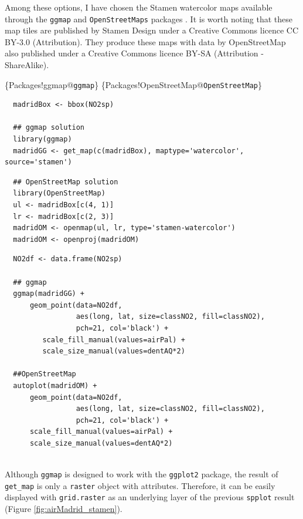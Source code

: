 Among these options, I have chosen the Stamen watercolor maps
available through the \texttt{ggmap} \cite{Kahle.Wickham2013} and
\texttt{OpenStreetMaps} packages \cite{Fellows.Stotz2013}. It is worth noting
that these map tiles are published by Stamen Design under a Creative
Commons licence CC BY-3.0 (Attribution). They produce these maps with
data by OpenStreetMap also published under a Creative Commons licence
BY-SA (Attribution - ShareAlike).

\begin{LaTeX}
\index\{Packages!ggmap@\texttt{ggmap}\}
\index\{Packages!OpenStreetMap@\texttt{OpenStreetMap}\}
\end{LaTeX}

\lstset{language=r,label= ,caption= ,captionpos=b,numbers=none}
\begin{lstlisting}
  madridBox <- bbox(NO2sp)

  ## ggmap solution
  library(ggmap)
  madridGG <- get_map(c(madridBox), maptype='watercolor', source='stamen')
\end{lstlisting}

\lstset{language=r,label= ,caption= ,captionpos=b,numbers=none}
\begin{lstlisting}
  ## OpenStreetMap solution
  library(OpenStreetMap)
  ul <- madridBox[c(4, 1)]
  lr <- madridBox[c(2, 3)]
  madridOM <- openmap(ul, lr, type='stamen-watercolor')
  madridOM <- openproj(madridOM)
\end{lstlisting}

\lstset{language=r,label= ,caption= ,captionpos=b,numbers=none}
\begin{lstlisting}
  NO2df <- data.frame(NO2sp)
  
  ## ggmap
  ggmap(madridGG) +
      geom_point(data=NO2df,
                 aes(long, lat, size=classNO2, fill=classNO2),
                 pch=21, col='black') +
         scale_fill_manual(values=airPal) +
         scale_size_manual(values=dentAQ*2)
  
  ##OpenStreetMap
  autoplot(madridOM) + 
      geom_point(data=NO2df,
                 aes(long, lat, size=classNO2, fill=classNO2),
                 pch=21, col='black') +
      scale_fill_manual(values=airPal) +
      scale_size_manual(values=dentAQ*2)  
  
\end{lstlisting}

Although \texttt{ggmap} is designed to work with the \texttt{ggplot2} package, the
result of \texttt{get\_map} is only a \texttt{raster} object with
attributes. Therefore, it can be easily displayed with \texttt{grid.raster}
as an underlying layer of the previous \texttt{spplot} result (Figure
\ref{fig:airMadrid_stamen}).

